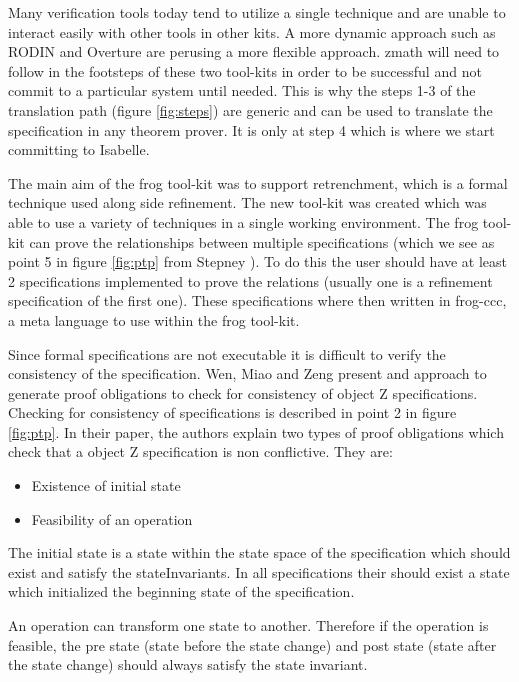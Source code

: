 Many verification tools today tend to utilize a single technique and are unable
to interact easily with other tools in other kits. A more dynamic approach such
as RODIN \cite{Jones05j} and Overture \cite{overture} are perusing a more
flexible approach. \gls{zmath} will need to follow in the footsteps of these two
tool-kits in order to be successful and not commit to a particular system until
needed. This is why the steps 1-3 of the translation path (figure
\ref{fig:steps}) are generic and can be used to translate the specification in
any theorem prover. It is only at step 4 which is where we start committing to
Isabelle.

The main aim of the frog tool-kit was to support retrenchment, which is a formal
technique used along side refinement. The new tool-kit was created which was
able to use a variety of techniques in a single working environment. The frog
tool-kit can prove the relationships between multiple specifications (which we
see as point 5 in figure \ref{fig:ptp} from Stepney \cite{stepney1998tale}). To
do this the user should have at least 2 specifications implemented to prove the
relations (usually one is a refinement specification of the first one). These
specifications where then written in frog-ccc, a meta language to use within the
frog tool-kit.

Since formal specifications are not executable it is difficult to verify the
consistency of the specification. Wen, Miao and Zeng
\cite{DBLP:conf/icsea/WenMZ06} present and approach to generate proof
obligations to check for consistency of object Z specifications. Checking for
consistency of specifications is described in point 2 in figure \ref{fig:ptp}.
In their paper, the authors explain two types of proof obligations which check
that a object Z specification is non conflictive. They are:

\begin{itemize}
\item Existence of initial state

\item Feasibility of an operation
\end{itemize}

The initial state is a state within the state space of the specification which
should exist and satisfy the stateInvariants. In all specifications their should
exist a state which initialized the beginning state of the specification.

An operation can transform one state to another. Therefore if the operation is
feasible, the pre state (state before the state change) and post state (state
after the state change) should always satisfy the state invariant. 

